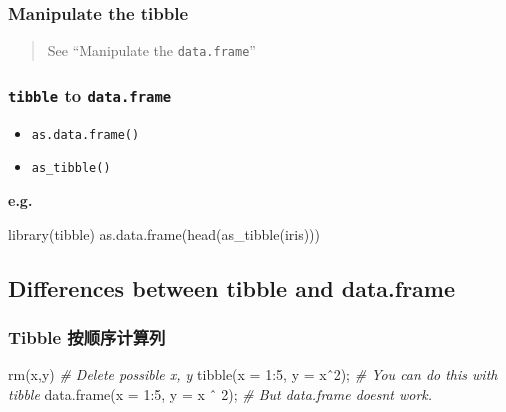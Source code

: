 \documentclass[
]{article}
\newenvironment{Shaded}{}{}
\newcommand{\AttributeTok}[1]{\textcolor[rgb]{0.49,0.56,0.16}{#1}}
\newcommand{\CommentTok}[1]{\textcolor[rgb]{0.38,0.63,0.69}{\textit{#1}}}
\newcommand{\DecValTok}[1]{\textcolor[rgb]{0.25,0.63,0.44}{#1}}
\newcommand{\FunctionTok}[1]{\textcolor[rgb]{0.02,0.16,0.49}{#1}}
\newcommand{\NormalTok}[1]{#1}
\newcommand{\SpecialCharTok}[1]{\textcolor[rgb]{0.25,0.44,0.63}{#1}}
\begin{document}
\hypertarget{manipulate-the-tibble}{%
\subsubsection{Manipulate the tibble}\label{manipulate-the-tibble}}

\begin{quote}
See ``Manipulate the \texttt{data.frame}''
\end{quote}

\hypertarget{tibble-to-dataframe}{%
\subsubsection{\texorpdfstring{\texttt{tibble} to
\texttt{data.frame}}{tibble to data.frame}}\label{tibble-to-dataframe}}

\begin{itemize}
\item
  \texttt{as.data.frame()}
\item
  \texttt{as\_tibble()}
\end{itemize}

\textbf{e.g.}

\begin{Shaded}
\begin{Highlighting}[]
\FunctionTok{library}\NormalTok{(tibble)}
\FunctionTok{as.data.frame}\NormalTok{(}\FunctionTok{head}\NormalTok{(}\FunctionTok{as\_tibble}\NormalTok{(iris)))}
\end{Highlighting}
\end{Shaded}

\hypertarget{differences-between-tibble-and-dataframe}{%
\subsection{Differences between tibble and
data.frame}\label{differences-between-tibble-and-dataframe}}

\hypertarget{tibble-ux6309ux987aux5e8fux8ba1ux7b97ux5217}{%
\subsubsection{Tibble
按顺序计算列}\label{tibble-ux6309ux987aux5e8fux8ba1ux7b97ux5217}}

\begin{Shaded}
\begin{Highlighting}[]
\FunctionTok{rm}\NormalTok{(x,y) }\CommentTok{\# Delete possible x, y}
\FunctionTok{tibble}\NormalTok{(}\AttributeTok{x =} \DecValTok{1}\SpecialCharTok{:}\DecValTok{5}\NormalTok{, }\AttributeTok{y =}\NormalTok{ xˆ2); }\CommentTok{\# You can do this with tibble}
\FunctionTok{data.frame}\NormalTok{(}\AttributeTok{x =} \DecValTok{1}\SpecialCharTok{:}\DecValTok{5}\NormalTok{, }\AttributeTok{y =}\NormalTok{ x ˆ }\DecValTok{2}\NormalTok{); }\CommentTok{\# But data.frame doesn\textquotesingle{}t work.}
\end{Highlighting}
\end{Shaded}
\end{document}
